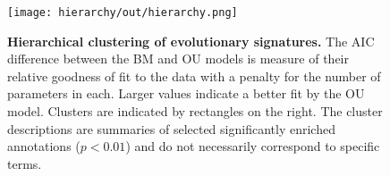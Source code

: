 \begin{figure}[h!]
\texttt{[image: hierarchy/out/hierarchy.png]}
\centering
\caption{\textbf{Hierarchical clustering of evolutionary signatures.}
The AIC difference between the BM and OU models is measure of their relative goodness of fit to the data with a penalty for the number of parameters in each. Larger values indicate a better fit by the OU model. Clusters are indicated by rectangles on the right. The cluster descriptions are summaries of selected significantly enriched annotations ($p < 0.01$) and do not necessarily correspond to specific terms.}
\label{fig:hierarchy}
\end{figure}
